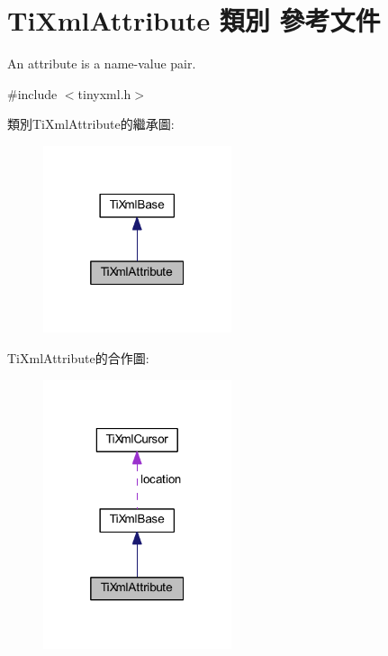 \hypertarget{class_ti_xml_attribute}{}\section{Ti\+Xml\+Attribute 類別 參考文件}
\label{class_ti_xml_attribute}


An attribute is a name-\/value pair.  




{\ttfamily \#include $<$tinyxml.\+h$>$}



類別\+Ti\+Xml\+Attribute的繼承圖\+:\nopagebreak
\begin{figure}[H]
\begin{center}
\leavevmode
\includegraphics[width=157pt]{class_ti_xml_attribute__inherit__graph}
\end{center}
\end{figure}


Ti\+Xml\+Attribute的合作圖\+:\nopagebreak
\begin{figure}[H]
\begin{center}
\leavevmode
\includegraphics[width=157pt]{class_ti_xml_attribute__coll__graph}
\end{center}
\end{figure}
